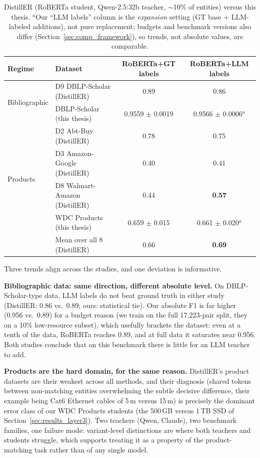 \documentclass[a4paper,oneside,bibliography=totoc]{scrbook}
\begin{document}
\begin{table}[!htbp]
  \centering
  \footnotesize
  \setlength{\tabcolsep}{2pt}
  \begin{tabular}{llcc}
    \toprule
    \textbf{Regime} & \textbf{Dataset} & \textbf{RoBERTa+GT labels} & \textbf{RoBERTa+LLM labels} \\
    \midrule
    \multirow{2}{*}{Bibliographic}
      & D9 DBLP-Scholar (DistillER) & 0.89 & 0.86 \\
      & DBLP-Scholar (this thesis) & 0.9559 $\pm$ 0.0019 & 0.9566 $\pm$ 0.0006$^{a}$ \\
    \midrule
    \multirow{4}{*}{Products}
      & D2 Abt-Buy (DistillER) & 0.78 & 0.75 \\
      & D3 Amazon-Google (DistillER) & 0.40 & 0.41 \\
      & D8 Walmart-Amazon (DistillER) & 0.44 & \textbf{0.57} \\
      & WDC Products (this thesis) & 0.659 $\pm$ 0.015 & 0.661 $\pm$ 0.020$^{a}$ \\
    \midrule
    & Mean over all 8 (DistillER) & 0.66 & \textbf{0.69} \\
    \bottomrule
  \end{tabular}
  \caption{DistillER (RoBERTa student, Qwen-2.5:32b teacher, $\sim$10\% of entities) versus this thesis. $^{a}$Our ``LLM labels'' column is the \emph{expansion} setting (GT base + LLM-labeled additions), not pure replacement; budgets and benchmark versions also differ (Section~\ref{sec:comp_framework}), so trends, not absolute values, are comparable.}
  \label{tab:comp_distiller}
\end{table}

Three trends align across the studies, and one deviation is informative.

\textbf{Bibliographic data: same direction, different absolute level.} On DBLP-Scholar-type data, LLM labels do not beat ground truth in either study (DistillER: 0.86 vs.\ 0.89; ours: statistical tie). Our absolute F1 is far higher (0.956 vs.\ 0.89) for a budget reason (we train on the full 17{,}223-pair split, they on a 10\% low-resource subset), which usefully brackets the dataset: even at a tenth of the data, RoBERTa reaches 0.89, and at full data it saturates near 0.956. Both studies conclude that on this benchmark there is little for an LLM teacher to add.

\textbf{Products are the hard domain, for the same reason.} DistillER's product datasets are their weakest across all methods, and their diagnosis (shared tokens between non-matching entities overwhelming the subtle decisive difference, their example being Cat6 Ethernet cables of 5\,m versus 15\,m) is precisely the dominant error class of our WDC Products students (the 500\,GB versus 1\,TB SSD of Section~\ref{sec:results_layer3}). Two teachers (Qwen, Claude), two benchmark families, one failure mode: variant-level distinctions are where both teachers and students struggle, which supports treating it as a property of the product-matching task rather than of any single model.
\end{document}
